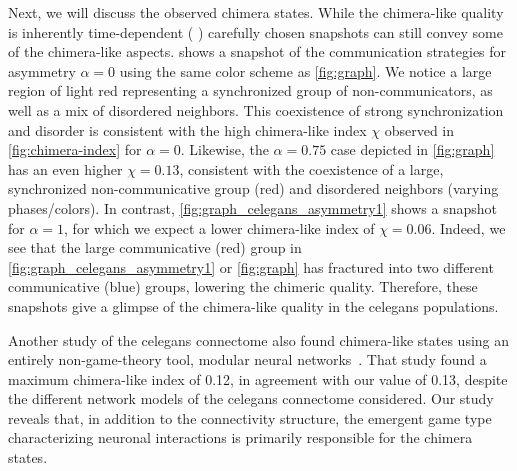 \documentclass[pdflatex,lineno,referee,sn-nature]{sn-jnl}
\begin{document}
Next, we will discuss the observed chimera states.
While the chimera-like quality is inherently time-dependent
(\cf{} )
carefully chosen snapshots can still convey some of the chimera-like aspects.
 shows a snapshot of the communication strategies
for asymmetry $\alpha = 0$ using the same color scheme as \cref{fig:graph}.
We notice a large region of light red representing
a synchronized group of non-communicators,
as well as a mix of disordered neighbors.
This coexistence of strong synchronization and disorder
is consistent with the high
chimera-like index $\chi$ observed in \cref{fig:chimera-index} for $\alpha = 0$.
Likewise, the $\alpha = 0.75$ case depicted in \cref{fig:graph}
has an even higher $\chi = \num{0.13}$,
consistent with the coexistence of a large,
synchronized non-communicative group (red)
and disordered neighbors (varying phases/colors).
In contrast,
\cref{fig:graph_celegans_asymmetry1} shows a snapshot for $\alpha = 1$,
for which we expect a lower chimera-like index of $\chi = \num{0.06}$.
Indeed, we see that the large communicative (red) group
in \cref{fig:graph_celegans_asymmetry1}
or \cref{fig:graph} has fractured into two different
communicative (blue) groups, lowering the chimeric quality.
Therefore, these snapshots give a glimpse of the chimera-like quality
in the \gls{celegans} populations.

Another study of the \gls{celegans} connectome also found
chimera-like states using an entirely non-game-theory tool,
modular neural networks~\citep{hizanidis2016chimera}.
That study found a maximum chimera-like index of \num{0.12},
in agreement with our value of \num{0.13}, despite the different network models
of the \gls{celegans} connectome considered.
Our study reveals that, in addition to the connectivity structure,
the emergent game type characterizing neuronal interactions is primarily responsible
for the chimera states.
\end{document}
